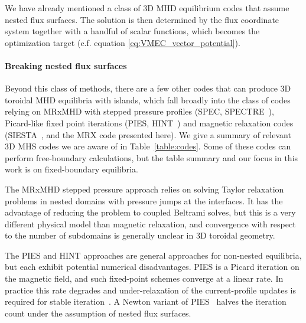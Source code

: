 \documentclass[%
 reprint,
 superscriptaddress,
 amsmath,amssymb,
 aps, nofootinbib, floatfix]{revtex4-2}
\begin{document}
We have already mentioned a class of 3D MHD equilibrium codes that assume nested flux surfaces. The solution is then determined by the flux coordinate system together with a handful of scalar functions, which becomes the optimization target (c.f. equation \eqref{eq:VMEC_vector_potential}). 

\paragraph{Breaking nested flux surfaces}
Beyond this class of methods, there are a few other codes that can produce 3D toroidal MHD equilibria with islands, which fall broadly into the class of codes relying on MRxMHD with stepped pressure profiles (SPEC, SPECTRE~\cite{loizu_verification_2016, balkovic2026spectre}), Picard-like fixed point iterations (PIES, HINT~\cite{drevlak_pies_2005, suzuki_development_2006, suzuki_hint_2017}) and magnetic relaxation codes (SIESTA~\cite{hirshman_siesta_2011}, and the MRX code presented here). We give a summary of relevant 3D MHS codes we are aware of in Table~\ref{table:codes}. Some of these codes can perform free-boundary calculations, but the table summary and our focus in this work is on fixed-boundary equilibria.

\begin{table}[t]
\caption{Three-dimensional MHD equilibrium codes for stellarator geometry, ordered by year
of first publication.
Codes restricted to Cartesian geometry used to study the Parker problem are omitted, such as~\cite{candelaresi_mimetic_2014,
smiet_ideal_2017, he_topology-preserving_2025, mao2026structure}. Also omitted are codes for time-dependent MHD, e.g. JOREK3D~\cite{nikulsin_jorek3d_2022}, {M3D-C1}~\cite{jardin_multiple_2012} and {NIMSTELL}~\cite{sovinec_modeling_2024}.
}

\label{table:codes}
\end{table}

The MRxMHD stepped pressure approach relies on solving Taylor relaxation problems in nested domains with pressure jumps at the interfaces. It has the advantage of reducing the problem to coupled Beltrami solves, but this is a very different physical model than magnetic relaxation, and convergence with respect to the number of subdomains is generally unclear in 3D toroidal geometry. 

The PIES and HINT approaches are general approaches for non-nested equilibria, but each exhibit potential numerical disadvantages. PIES is a Picard iteration on the magnetic field, and such fixed-point schemes converge at a linear rate. In practice this rate degrades and under-relaxation of the current-profile updates is required for stable iteration~\cite{reiman_computation_1990}. A Newton variant of PIES~\cite{oliver_solving_2006} halves the iteration count under the assumption of nested flux surfaces.
\end{document}
